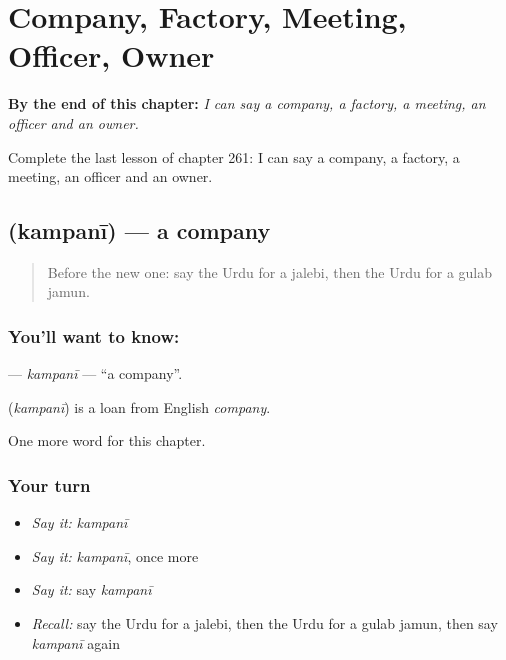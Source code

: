 
\chapter{Company, Factory, Meeting, Officer, Owner}
\label{ch:ur-company-factory-meeting-officer-owner}

\begin{chapteropening}
\textbf{By the end of this chapter:} \emph{I can say a company, a factory, a meeting, an officer and an owner.}

Complete the last lesson of chapter 261: I can say a company, a factory, a meeting, an officer and an owner.
\end{chapteropening}

\section[\texorpdfstring{\ur{کمپنی} (kampanī)}{کمپنی (kampanī)}]{ (kampanī) — a company}

\label{lesson:UR-C261-kampani}



\begin{quote}
Before the new one: say the Urdu for a jalebi, then the Urdu for a gulab jamun.
\end{quote}

\subsection*{You'll want to know: }
\textbf{} — \emph{kampanī} — \textquotedblleft{}a company\textquotedblright{}.

\begin{cousinweb}
\textbf{} (\emph{kampanī}) is a loan from English \emph{company}.
\end{cousinweb}

\begin{grammarlens}[title={What you've built}]
One more word for this chapter.
\end{grammarlens}

\subsection*{Your turn}
\begin{itemize}
\raggedright
  \item \emph{Say it:} \emph{kampanī}
  \item \emph{Say it:} \emph{kampanī}, once more
  \item \emph{Say it:} say \emph{kampanī}
  \item \emph{Recall:} say the Urdu for a jalebi, then the Urdu for a gulab jamun, then say \emph{kampanī} again
\end{itemize}

